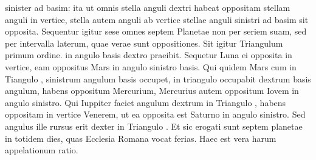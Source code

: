 sinister ad basim: ita ut omnis stella anguli dextri habeat oppositam
stellam anguli in vertice, stella autem anguli ab vertice stellae
anguli sinistri ad basim sit opposita.
%
Sequentur igitur sese omnes septem
Planetae non per seriem suam, sed per intervalla laterum, quae
verae sunt oppositiones.
Sit igitur Triangulum  primum ordine.
 in angulo basis dextro praeibit.
Sequetur Luna ei opposita in vertice,
eam oppositus Mars in angulo sinistro basis.
Qui quidem Mars cum in
Tiangulo , sinistrum angulum basis occupet,
 in triangulo  occupabit
dextrum basis angulum, habens oppositum Mercurium,
Mercurius autem oppositum Iovem in angulo sinistro.
Qui Iuppiter
faciet angulum dextrum in Triangulo , habens oppositam in vertice
Venerem, ut ea opposita est Saturno in angulo sinistro.
Sed angulus
ille rursus erit dexter in Triangulo .
Et sic erogati sunt septem
planetae in totidem dies, quas Ecclesia Romana vocat ferias.
Haec est vera harum appelationum ratio.
